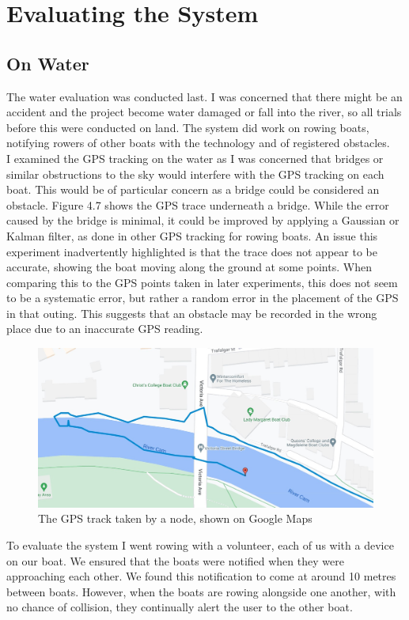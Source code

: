 \documentclass[12pt,a4paper]{report}
\begin{document}
{\section{Evaluating the System}
\subsection{On Water} 
The water evaluation was conducted last. I was concerned that there might be an accident and the project become water damaged or fall into the river, so all trials before this were conducted on land. The system did work on rowing boats, notifying rowers of other boats with the technology and of registered obstacles. \\
I examined the GPS tracking on the water as I was concerned that bridges or similar obstructions to the sky would interfere with the GPS tracking on each boat. This would be of particular concern as a bridge could be considered an obstacle. Figure 4.7 shows the GPS trace underneath a bridge. While the error caused by the bridge is minimal, it could be improved by applying a Gaussian or Kalman filter, as done in other GPS tracking for rowing boats. An issue this experiment inadvertently highlighted is that the trace does not appear to be accurate, showing the boat moving along the ground at some points. When comparing this to the GPS points taken in later experiments, this does not seem to be a systematic error, but rather a random error in the placement of the GPS in that outing. This suggests that an obstacle may be recorded in the wrong place due to an inaccurate GPS reading.
\begin{figure}[h]
\begin{center}
\includegraphics[scale=0.3]{bridgeGPS.jpg}
\end{center}
\caption{The GPS track taken by a node, shown on Google Maps \cite{googlemapsgeneral}}
\end{figure}
To evaluate the system I went rowing with a volunteer, each of us with a device on our boat. We ensured that the boats were notified when they were approaching each other. We found this notification to come at around 10 metres between boats. However, when the boats are rowing alongside one another, with no chance of collision, they continually alert the user to the other boat. \\ %

}
\end{document}
